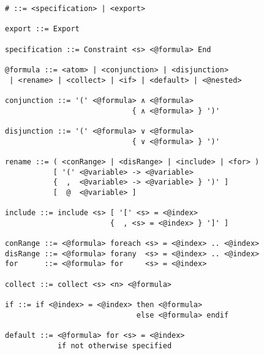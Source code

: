\begin{figure}[h]
\begin{lstlisting}[language=BNF,basicstyle=\linespread{0.8}\ttfamily,
                   captionpos=t,caption=
   {Verbatim display of the grammar file that is used to generate the parser for
    CAnDL.
    The file is in a custom version of Backus–Naur form.
    In the parse tree, all expressions that start with ``{@}'' are
    automatically expanded.
    The character ``\#'' marks the top-level language construct.
    Any expression that does not ultimately become part of this construct
    constitutes a syntax error.\parfillskip=0pt}]
# ::= <specification> | <export>

export ::= Export

specification ::= Constraint <s> <@formula> End

@formula ::= <atom> | <conjunction> | <disjunction>
 | <rename> | <collect> | <if> | <default> | <@nested>

conjunction ::= '(' <@formula> ∧ <@formula>
                             { ∧ <@formula> } ')'

disjunction ::= '(' <@formula> ∨ <@formula>
                             { ∨ <@formula> } ')'

rename ::= ( <conRange> | <disRange> | <include> | <for> )
           [ '(' <@variable> -> <@variable>
           {  ,  <@variable> -> <@variable> } ')' ]
           [  @  <@variable> ]

include ::= include <s> [ '[' <s> = <@index>
                        {  , <s> = <@index> } ']' ]

conRange ::= <@formula> foreach <s> = <@index> .. <@index>
disRange ::= <@formula> forany  <s> = <@index> .. <@index>
for      ::= <@formula> for     <s> = <@index>

collect ::= collect <s> <n> <@formula>

if ::= if <@index> = <@index> then <@formula>
                              else <@formula> endif

default ::= <@formula> for <s> = <@index>
            if not otherwise specified
\end{lstlisting}
\end{figure}
